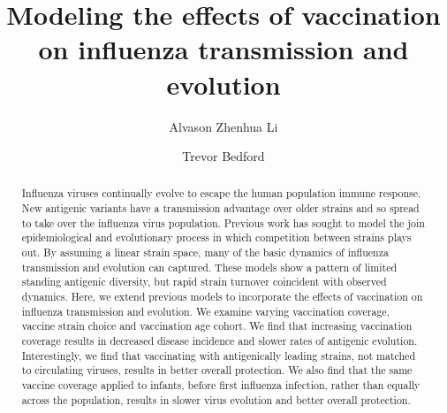\documentclass[preprint,12pt]{elsarticle}
\begin{document}
\begin{frontmatter}



\title{Modeling the effects of vaccination on influenza transmission and evolution}


\author{Alvason Zhenhua Li}

\author{Trevor Bedford}


\address{Vaccine and Infectious Disease Division, Fred Hutchinson Cancer Research Center, Seattle, WA 98109, USA}


\begin{abstract}
Influenza viruses continually evolve to escape the human population immune response.
New antigenic variants have a transmission advantage over older strains and so spread to take over the influenza virus population.
Previous work has sought to model the join epidemiological and evolutionary process in which competition between strains plays out.
By assuming a linear strain space, many of the basic dynamics of influenza transmission and evolution can captured.
These models show a pattern of limited standing antigenic diversity, but rapid strain turnover coincident with observed dynamics.
Here, we extend previous models to incorporate the effects of vaccination on influenza transmission and evolution.
We examine varying vaccination coverage, vaccine strain choice and vaccination age cohort.
We find that increasing vaccination coverage results in decreased disease incidence and slower rates of antigenic evolution.
Interestingly, we find that vaccinating with antigenically leading strains, not matched to circulating viruses, results in better overall protection.
We also find that the same vaccine coverage applied to infants, before first influenza infection, rather than equally across the population, results in slower virus evolution and better overall protection.
\end{abstract}


\end{frontmatter}
\end{document}
